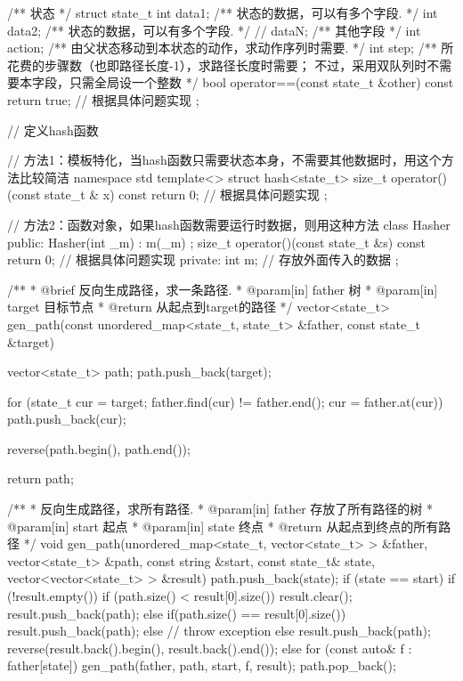 \begin{Codex}[label=bfs_common.h]
/** 状态 */
struct state_t {
    int data1;  /** 状态的数据，可以有多个字段. */
    int data2;  /** 状态的数据，可以有多个字段. */
    // dataN;   /** 其他字段 */
    int action; /** 由父状态移动到本状态的动作，求动作序列时需要. */
    int step;  /** 所花费的步骤数（也即路径长度-1），求路径长度时需要；
                    不过，采用双队列时不需要本字段，只需全局设一个整数 */
    bool operator==(const state_t &other) const {
        return true;  // 根据具体问题实现
    }
};

// 定义hash函数

// 方法1：模板特化，当hash函数只需要状态本身，不需要其他数据时，用这个方法比较简洁
namespace std {
template<> struct hash<state_t> {
    size_t operator()(const state_t & x) const {
        return 0; // 根据具体问题实现
    }
};
}

// 方法2：函数对象，如果hash函数需要运行时数据，则用这种方法
class Hasher {
public:
    Hasher(int _m) : m(_m) {};
    size_t operator()(const state_t &s) const {
        return 0; // 根据具体问题实现
    }
private:
    int m; // 存放外面传入的数据
};

/**
 * @brief 反向生成路径，求一条路径.
 * @param[in] father 树
 * @param[in] target 目标节点
 * @return 从起点到target的路径
 */
vector<state_t> gen_path(const unordered_map<state_t, state_t> &father,
        const state_t &target) {
    vector<state_t> path;
    path.push_back(target);

    for (state_t cur = target; father.find(cur) != father.end(); 
            cur = father.at(cur))
        path.push_back(cur);

    reverse(path.begin(), path.end());

    return path;
}

/**
 * 反向生成路径，求所有路径.
 * @param[in] father 存放了所有路径的树
 * @param[in] start 起点
 * @param[in] state 终点
 * @return 从起点到终点的所有路径
 */
void gen_path(unordered_map<state_t, vector<state_t> > &father,
        vector<state_t> &path, const string &start, const state_t& state,
        vector<vector<state_t> > &result) {
    path.push_back(state);
    if (state == start) {
        if (!result.empty()) {
            if (path.size() < result[0].size()) {
                result.clear();
                result.push_back(path);
            } else if(path.size() == result[0].size()) {
                result.push_back(path);
            } else {
                // throw exception
            }
        } else {
            result.push_back(path);
        }
        reverse(result.back().begin(), result.back().end());
    } else {
        for (const auto& f : father[state]) {
            gen_path(father, path, start, f, result);
        }
    }
    path.pop_back();
}
\end{Codex}


